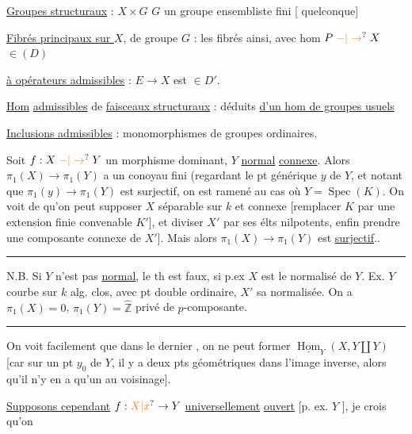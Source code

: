 \uline{Groupes structuraux} : $X\times G$ $G$ un groupe ensembliste
fini [ quelconque]

\uline{Fibrés principaux  sur $X$}, de groupe $G$ : les
fibrés \uline{} ainsi, avec hom $P\mathrel{\unsure{-|\to}}X$ $\in(D)$

\uline{ à opérateurs admissibles} :   $E\to X$ est $\in D'$.

\uline{Hom} \uline{admissibles} de  \uline{faisceaux structuraux} : déduits
\uline{d'un hom de groupes usuels}

 \uline{Inclusions admissibles} :  monomorphismes
de groupes ordinaires.

Soit $f:X\mathrel{\unsure{-|\to}}Y$ un morphisme  dominant, $Y$  \uline{normal} \uline{connexe}.
Alors $\pi_1(X)\to\pi_1(Y)$ a un conoyau fini (regardant
le pt générique $y$ de $Y$, et notant que $\pi_1(y)\to\pi_1(Y)$ est
surjectif, on est ramené au cas où $Y=\operatorname{Spec}(K)$.
On voit de  qu'on peut supposer $X$ séparable sur $k$
et  connexe [remplacer $K$ par une extension 
finie convenable $K'$], et diviser  $X'$ par ses élts
nilpotents, enfin prendre une composante connexe
de $X'$]. Mais alors $\pi_1(X)\to\pi_1(Y)$ est \uline{surjectif}..

\noindent\rule{2em}{0.25pt}

N.B. Si $Y$ n'est pas \uline{normal}, le th est faux,
 si p.ex $X$ est le normalisé de $Y$. Ex. $Y$ courbe
 sur $k$ alg. clos, avec pt double ordinaire,
$X'$ sa normalisée. On a $\pi_1(X)=0$, $\pi_1(Y)=\widehat{\mathbb Z}$
privé de  $p$-composante.

\noindent\rule{2em}{0.25pt}

On voit facilement que dans le dernier
, on ne peut former $\underline{\operatorname{Hom}}_Y(X,Y\amalg Y)$
[car sur un  pt $y_0$ de $Y$, il y a deux pts
géométriques dans l'image inverse, alors
qu'il n'y en a qu'un au voisinage].

\uline{Supposons cependant} $f:\unsure{X|x}\to Y$ \uline{universellement}
\uline{ouvert} [p. ex. $Y$ ], je crois qu'on

